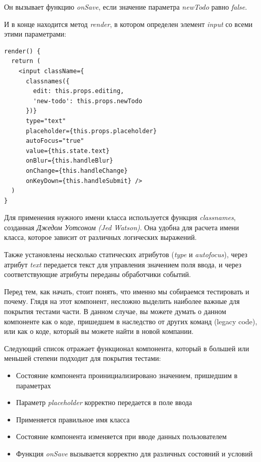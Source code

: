 Он вызывает функцию \textit{onSave}, если значение параметра \textit{newTodo} равно \textit{false}.

И в конце находится метод \textit{render}, в котором определен элемент \textit{input} со всеми этими параметрами:

\begin{lstlisting}
render() {
  return (
    <input className={
      classnames({
        edit: this.props.editing,
        'new-todo': this.props.newTodo
      })}
      type="text"
      placeholder={this.props.placeholder}
      autoFocus="true"
      value={this.state.text}
      onBlur={this.handleBlur}
      onChange={this.handleChange}
      onKeyDown={this.handleSubmit} />
  )
}
\end{lstlisting}

Для применения нужного имени класса используется функция \textit{classnames}, созданная \textit{Джедом Уотсоном (Jed Watson)}. Она удобна для расчета имени класса, которое зависит от различных логических выражений.

Также установлены несколько статических атрибутов (\textit{type} и \textit{autofocus}),	 через атрибут \textit{text} передается текст для управления значением поля ввода, и через соответствующие атрибуты переданы обработчики событий.

Перед тем, как начать, стоит понять, что именно мы собираемся тестировать и почему. Глядя на этот компонент, несложно выделить наиболее важные для покрытия тестами части. В данном случае, вы можете думать о данном компоненте как о коде, пришедшем в наследство от других команд (legacy code), или как о коде, который вы можете найти в новой компании.

Следующий список отражает функционал компонента, который в большей или меньшей степени подходит для покрытия тестами:

\begin{itemize}
  \item Состояние компонента проинициализировано значением, пришедшим в параметрах
  \item Параметр \textit{placeholder} корректно передается в поле ввода
  \item Применяется правильное имя класса
  \item Состояние компонента изменяется при вводе данных пользователем
  \item Функция \textit{onSave} вызывается корректно для различных состояний и условий
\end{itemize}


